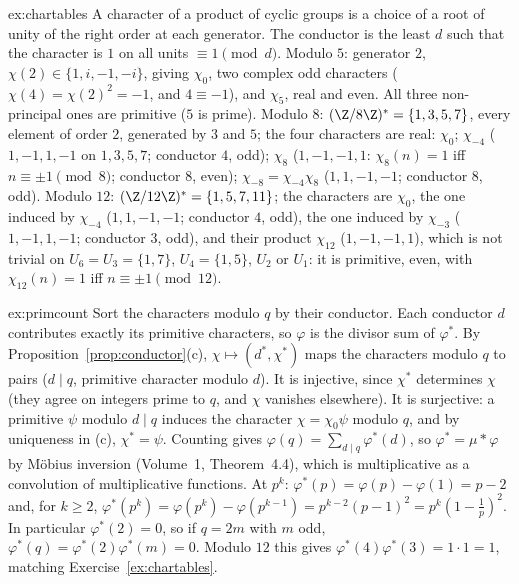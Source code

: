 \begin{solution}{ex:chartables}
\idea A character of a product of cyclic groups is a choice of a root of unity of the right order at each generator. The conductor is the
least $d$ such that the character is $1$ on all units $\equiv1\pmod d$.
\writeup Modulo $5$: generator $2$, $\chi(2)\in\{1,i,-1,-i\}$, giving $\chi_0$, two complex odd characters ($\chi(4)=\chi(2)^2=-1$, and $4\equiv-1$), and $\chi_5$, real
and even. All three non-principal ones are primitive ($5$ is prime). Modulo $8$: $(\Z/8\Z)^*=\{1,3,5,7\}$, every element of order $2$, generated by
$3$ and $5$; the four characters are real: $\chi_0$; $\chi_{-4}$ ($1,-1,1,-1$ on $1,3,5,7$; conductor $4$, odd); $\chi_8$ ($1,-1,-1,1$: $\chi_8(n)=1$ iff $n\equiv\pm1\pmod8$;
conductor $8$, even); $\chi_{-8}=\chi_{-4}\chi_8$ ($1,1,-1,-1$; conductor $8$, odd). Modulo $12$: $(\Z/12\Z)^*=\{1,5,7,11\}$; the characters are $\chi_0$, the one induced by
$\chi_{-4}$ ($1,1,-1,-1$; conductor $4$, odd), the one induced by $\chi_{-3}$ ($1,-1,1,-1$; conductor $3$, odd), and their product $\chi_{12}$ ($1,-1,-1,1$), which is
not trivial on $U_6=U_3=\{1,7\}$, $U_4=\{1,5\}$, $U_2$ or $U_1$: it is primitive, even, with $\chi_{12}(n)=1$ iff $n\equiv\pm1\pmod{12}$.
\end{solution}

\begin{solution}{ex:primcount}
\idea Sort the characters modulo $q$ by their conductor. Each conductor $d$ contributes exactly its primitive characters, so $\varphi$ is the
divisor sum of $\varphi^*$.
\writeup By Proposition~\ref{prop:conductor}(c), $\chi\mapsto(d^*,\chi^*)$ maps the characters modulo $q$ to pairs ($d\mid q$, primitive character modulo $d$). It is
injective, since $\chi^*$ determines $\chi$ (they agree on integers prime to $q$, and $\chi$ vanishes elsewhere). It is surjective: a primitive $\psi$
modulo $d\mid q$ induces the character $\chi=\chi_0\psi$ modulo $q$, and by uniqueness in (c), $\chi^*=\psi$. Counting gives $\varphi(q)=\sum_{d\mid q}\varphi^*(d)$, so
$\varphi^*=\mu*\varphi$ by Möbius inversion (Volume~1, Theorem~4.4), which is multiplicative as a convolution of multiplicative functions. At $p^k$:
$\varphi^*(p)=\varphi(p)-\varphi(1)=p-2$ and, for $k\ge2$, $\varphi^*(p^k)=\varphi(p^k)-\varphi(p^{k-1})=p^{k-2}(p-1)^2=p^k(1-\frac1p)^2$. In particular $\varphi^*(2)=0$, so if
$q=2m$ with $m$ odd, $\varphi^*(q)=\varphi^*(2)\varphi^*(m)=0$. Modulo $12$ this gives $\varphi^*(4)\varphi^*(3)=1\cdot1=1$, matching Exercise~\ref{ex:chartables}.
\end{solution}

